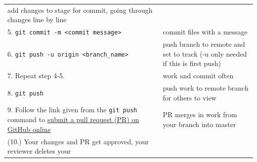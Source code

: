 \documentclass[]{book}
\begin{document}
\begin{longtable}[]{@{}ll@{}}
\begin{minipage}[t]{0.22\columnwidth}
add changes to stage for commit, going through changes line by
line\strut
\end{minipage}\tabularnewline
\begin{minipage}[t]{0.13\columnwidth}\raggedright\strut
5.
\texttt{git\ commit\ -m\ \textless{}commit\ message\textgreater{}}\strut
\end{minipage} & \begin{minipage}[t]{0.22\columnwidth}\raggedright\strut
commit files with a message\strut
\end{minipage}\tabularnewline
\begin{minipage}[t]{0.13\columnwidth}\raggedright\strut
6.
\texttt{git\ push\ -u\ origin\ \textless{}branch\_name\textgreater{}}\strut
\end{minipage} & \begin{minipage}[t]{0.22\columnwidth}\raggedright\strut
push branch to remote and set to track (-u only needed if this is first
push)\strut
\end{minipage}\tabularnewline
\begin{minipage}[t]{0.13\columnwidth}\raggedright\strut
7. Repeat step 4-5.\strut
\end{minipage} & \begin{minipage}[t]{0.22\columnwidth}\raggedright\strut
work and commit often\strut
\end{minipage}\tabularnewline
\begin{minipage}[t]{0.13\columnwidth}\raggedright\strut
8. \texttt{git\ push}\strut
\end{minipage} & \begin{minipage}[t]{0.22\columnwidth}\raggedright\strut
push work to remote branch for others to view\strut
\end{minipage}\tabularnewline
\begin{minipage}[t]{0.13\columnwidth}\raggedright\strut
9. Follow the link given from the \texttt{git\ push} command to
\href{https://help.github.com/en/github/collaborating-with-issues-and-pull-requests/creating-a-pull-request\#creating-the-pull-request}{submit
a pull request (PR) on GitHub online}\strut
\end{minipage} & \begin{minipage}[t]{0.22\columnwidth}\raggedright\strut
PR merges in work from your branch into master\strut
\end{minipage}\tabularnewline
\begin{minipage}[t]{0.13\columnwidth}\raggedright\strut
(10.) Your changes and PR get approved, your reviewer deletes your

\end{minipage}
\end{longtable}
\end{document}
